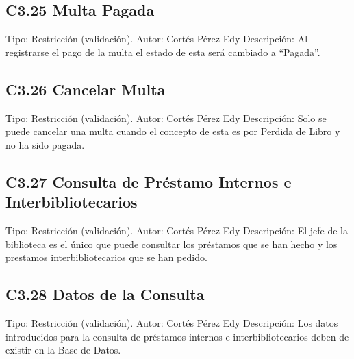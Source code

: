 \subsection{C3.25 Multa Pagada }
	\UCli Tipo: Restricción (validación).
	\UCli Autor: Cortés Pérez Edy
	\UCli Descripción: Al registrarse el pago de la multa el estado de esta será cambiado a “Pagada”.
	
\subsection{C3.26 Cancelar Multa }
	\UCli Tipo: Restricción (validación).
	\UCli Autor: Cortés Pérez Edy
	\UCli Descripción: Solo se puede cancelar una multa cuando el concepto de esta es por Perdida de Libro y no ha sido pagada.
	
\subsection{C3.27 Consulta de Préstamo Internos e Interbibliotecarios }
	\UCli Tipo: Restricción (validación).
	\UCli Autor: Cortés Pérez Edy
	\UCli Descripción: El jefe de la biblioteca es el único que puede consultar los préstamos que se han hecho y los prestamos interbibliotecarios que se han pedido.
	
\subsection{C3.28 Datos de la Consulta }
	\UCli Tipo: Restricción (validación).
	\UCli Autor: Cortés Pérez Edy
	\UCli Descripción: Los datos introducidos para la consulta de préstamos internos e interbibliotecarios deben de existir en la Base de Datos.






